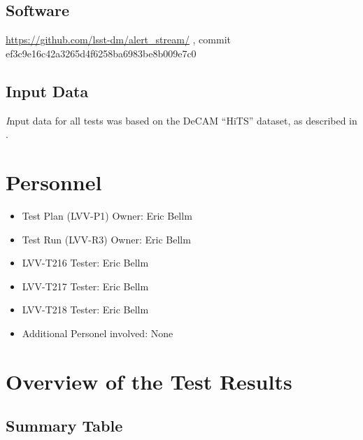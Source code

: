 \documentclass[DM,lsstdraft,STR,toc]{lsstdoc}
\begin{document}
\subsection{Software}
\label{sect:swconf}

\url{https://github.com/lsst-dm/alert_stream/} , commit ef3c9e16c42a3265d4f6258ba6983be8b009e7c0


\subsection{Input Data}
\label{sect:inputdata}

{\textit Input data for all tests was based on the DeCAM “HiTS” dataset, as described in .}

\section{Personnel}
\label{sect:personnel}

\begin{itemize}
\item Test Plan (LVV-P1) Owner: Eric Bellm
\item Test Run (LVV-R3) Owner: Eric Bellm
\item LVV-T216 Tester: Eric Bellm
\item LVV-T217 Tester: Eric Bellm
\item LVV-T218 Tester: Eric Bellm
\item Additional Personel involved: None 
\end{itemize}

\newpage

\section{Overview of the Test Results}
\label{sect:overview}

\subsection{Summary Table}
\label{sect:summarytable}
\end{document}
